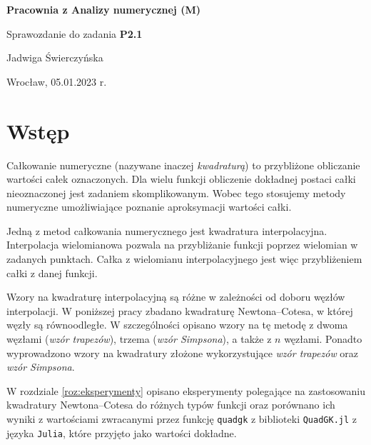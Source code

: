 \documentclass{article}
\theoremstyle{definition}
\begin{document}
\begin{center}
    \LARGE
    \textbf{Pracownia z Analizy numerycznej (M)}

    \medskip

    Sprawozdanie do zadania {\bf P2.1}

    \bigskip

    {\Large Jadwiga Świerczyńska}
    
    {\Large Wrocław, 05.01.2023 r.}
    
\end{center}

\vspace{70pt}


\section{Wstęp}

Całkowanie numeryczne (nazywane inaczej {\it kwadraturą}) to przybliżone obliczanie wartości całek oznaczonych. Dla wielu funkcji obliczenie dokładnej postaci całki nieoznaczonej jest zadaniem skomplikowanym. Wobec tego stosujemy metody numeryczne umożliwiające poznanie aproksymacji wartości całki. 

\medskip

\noindent Jedną z metod całkowania numerycznego jest kwadratura interpolacyjna. Interpolacja wielomianowa pozwala na przybliżanie funkcji poprzez wielomian w zadanych punktach. Całka z wielomianu interpolacyjnego jest więc przybliżeniem całki z danej funkcji. 

\medskip

\noindent Wzory na kwadraturę interpolacyjną są różne w zależności od doboru węzłów interpolacji. W poniższej pracy zbadano kwadraturę Newtona--Cotesa, w której węzły są równoodległe. W szczególności opisano wzory na tę metodę z dwoma węzłami ({\it wzór trapezów}), trzema ({\it wzór Simpsona}), a także z \(n\) węzłami. Ponadto wyprowadzono wzory na kwadratury złożone wykorzystujące {\it wzór trapezów} oraz {\it wzór Simpsona}. 

\medskip

\noindent W rozdziale \ref{roz:eksperymenty} opisano eksperymenty polegające na zastosowaniu kwadratury Newtona--Cotesa do różnych typów funkcji oraz porównano ich wyniki z wartościami zwracanymi przez funkcję \verb|quadgk| z biblioteki \verb|QuadGK.jl| z języka \verb|Julia|, które przyjęto jako wartości dokładne. 
\end{document}
